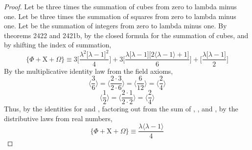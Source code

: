 \documentclass[preview]{standalone}
\begin{document}
\begin{proof}
    Let \bm{$\Phi$} be three times the summation of cubes from zero to lambda minus one.
    Let  be three times the summation of squares from zero to lambda minus one.
    Let \bm{$\Omega$} be the summation of integers from zero to lambda minus one.
    By theorems 2422 and 2421b, 
    by the closed formula for the summation of cubes,
    and by shifting the index of summation,
    \begin{equation*}
        \Bigg \{
            \Phi + \mathrm{X} + \Omega
        \Bigg \}
            \equiv
        3
        \Bigg[
            \frac{
                \lambda ^2
                \big[ \lambda - 1 \big] ^2
            }
            {4}
        \Bigg]
            +
        3
        \Bigg[
            \frac{
                \lambda 
                \big[ \lambda - 1 \big]
                \big[ 2 \langle \lambda - 1 \rangle + 1 \big]
            }
            {6}
        \Bigg]
            +
        \Bigg[
            \frac{\lambda \big [ \lambda - 1 ]}
            {2}
        \Bigg]
    \end{equation*} 
    By the multiplicative identity law from the field axioms,
    \begin{equation*}
        \bigg \langle 
            \frac{3}{6}
        \bigg \rangle
             = 
        \bigg \langle
            \frac{2 \cdot 3}{2 \cdot 6} 
        \bigg \rangle 
            = 
        \bigg \langle
            \frac{6}{12} 
        \bigg \rangle 
            = 
        \bigg \langle
            \frac{2}{4}
        \bigg \rangle
    \end{equation*}
    \begin{equation*}
        \bigg \langle 
            \frac{1}{2}
        \bigg \rangle
            =
        \bigg \langle
            \frac{2 \cdot 1}{2 \cdot 2}
        \bigg \rangle
            =
        \bigg \langle 
            \frac{2}{4}
        \bigg \rangle
    \end{equation*}
    Thus, by the identities for  and \bm{$\Omega$},
    factoring 
    out from the sum of \bm{$\Phi$}, , and \bm{$\Omega$},
    by the distributive laws from real numbers,
    \begin{equation*}
        \Bigg \{
            \Phi + \mathrm{X} + \Omega
        \Bigg \}
                \equiv
            \frac{
                \lambda \big \langle \lambda - 1 \big \rangle
            }
            {4}

\end{equation*}
\end{proof}
\end{document}
